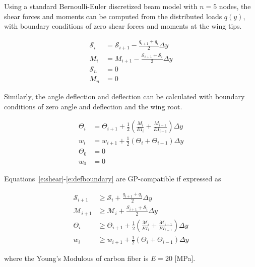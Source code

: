 \documentclass[]{aiaa-tc}%
\begin{document}
Using a standard Bernoulli-Euler discretized beam model with $n=5$ nodes, the shear forces and moments can be computed from the distributed loads $q(y)$, with boundary conditions of zero shear forces and moments at the wing tips.\cite{bending}

\begin{align}
    \label{e:shear}
    \mathcal{S}_i &= \mathcal{S}_{i+1} - \frac{q_{i+1} + q_i}{2}\Delta y \\
    \label{e:moment}
    M_i &= M_{i+1} - \frac{\mathcal{S}_{i+1} + \mathcal{S}_i}{2}\Delta y \\
    \label{e:shearboundary}
    \mathcal{S}_n &= 0 \\
    \label{e:momentboundary}
    M_n &= 0
\end{align}

Similarly, the angle deflection and deflection can be calculated with boundary conditions of zero angle and deflection and the wing root.\cite{bending}

\begin{align}
    \label{e:angle}
    \Theta_{i} &= \Theta_{i+1} + \frac{1}{2} \left(\frac{M_i}{EI_i} + \frac{M_{i-1}}{EI_{i-1}} \right) \Delta y \\
    \label{e:deflection}
    w_{i} &= w_{i+1} + \frac{1}{2} (\Theta_i + \Theta_{i-1}) \Delta y \\
    \label{e:angleboundary}
    \Theta_0 &= 0 \\
    \label{e:defboundary}
    w_0 &= 0 
\end{align}
 
Equations~\eqref{e:shear}-\eqref{e:defboundary} are GP-compatible if expressed as

\begin{align}
    \label{e:sheargp}
    \mathcal{S}_{i+1} &\geq \mathcal{S}_i + \frac{q_{i+1} + q_i}{2} \Delta y \\
    \label{e:momentgp}
    \mathcal{M}_{i+1} &\geq \mathcal{M}_i + \frac{\mathcal{S}_{i+1} + \mathcal{S}_i}{2} \Delta y \\
    \label{e:anglegp}
    \Theta_{i} &\geq \Theta_{i+1} + \frac{1}{2} \left(\frac{\mathcal{M}_i}{EI_i} + \frac{\mathcal{M}_{i-1}}{EI_{i-1}} \right) \Delta y \\
    \label{e:deflection}
    w_{i} &\geq w_{i+1} + \frac{1}{2} (\Theta_i + \Theta_{i-1}) \Delta y 
\end{align}

where the Young's Modulous of carbon fiber is $E = 20$ [MPa]. 
\end{document}
